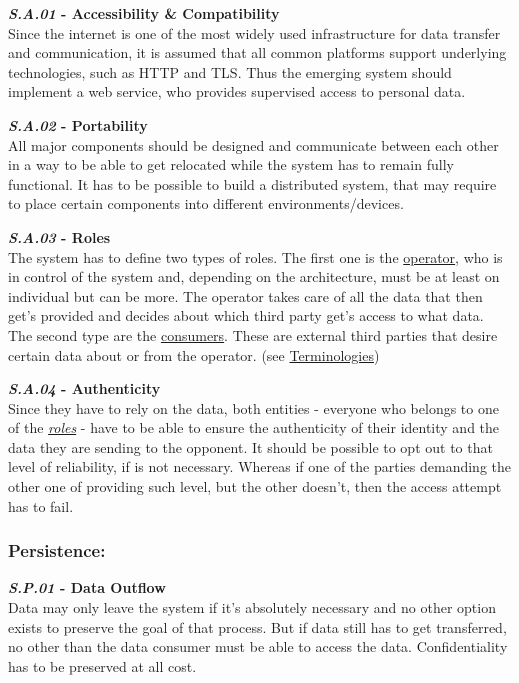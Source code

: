 \documentclass[12pt,english,a4paper,titlepage,cleardoublepage=empty,dottedtoc]{report}
\begin{document}
\textbf{\emph{\protect\hypertarget{sa01}{}{S.A.01}} - Accessibility \&
Compatibility}\\
Since the internet is one of the most widely used infrastructure for
data transfer and communication, it is assumed that all common platforms
support underlying technologies, such as HTTP and TLS. Thus the emerging
system should implement a web service, who provides supervised access to
personal data.

\textbf{\emph{\protect\hypertarget{sa02}{}{S.A.02}} - Portability}\\
All major components should be designed and communicate between each
other in a way to be able to get relocated while the system has to
remain fully functional. It has to be possible to build a distributed
system, that may require to place certain components into different
environments/devices.

\textbf{\emph{\protect\hypertarget{sa03}{}{S.A.03}} - Roles}\\
The system has to define two types of roles. The first one is the
\protect\hyperlink{terminologies--operator}{operator}, who is in control
of the system and, depending on the architecture, must be at least on
individual but can be more. The operator takes care of all the data that
then get's provided and decides about which third party get's access to
what data. The second type are the
\protect\hyperlink{terminologies--consumer}{consumers}. These are
external third parties that desire certain data about or from the
operator. (see \protect\hyperlink{terminologies}{Terminologies})

\textbf{\emph{\protect\hypertarget{sa04}{}{S.A.04}} - Authenticity}\\
Since they have to rely on the data, both entities - everyone who
belongs to one of the \emph{\protect\hyperlink{sa03}{roles}} - have to
be able to ensure the authenticity of their identity and the data they
are sending to the opponent. It should be possible to opt out to that
level of reliability, if is not necessary. Whereas if one of the parties
demanding the other one of providing such level, but the other doesn't,
then the access attempt has to fail.

\subsubsection{Persistence:}\label{persistence}

\textbf{\emph{\protect\hypertarget{sp01}{}{S.P.01}} - Data Outflow}\\
Data may only leave the system if it's absolutely necessary and no other
option exists to preserve the goal of that process. But if data still
has to get transferred, no other than the data consumer must be able to
access the data. Confidentiality has to be preserved at all cost.
\end{document}
